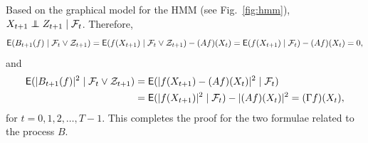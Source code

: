 \documentclass[twoside,11pt]{article}
\def\Fig#1{Fig.~\ref{#1}}
\def\clZ{{\cal Z}}
\def\E{{\sf E}}
\def\Fig#1{Fig.~\ref{#1}}
\def\clZ{{\cal Z}}
\def\E{{\sf E}}
\def\clZ{{\cal Z}}
\def\clF{{\cal F}}
\def\clZ{{\cal Z}}
\def\E{{\sf E}}
\begin{document}
Based on the graphical model for the HMM (see \Fig{fig:hmm}), $X_{t+1} \perp\!\!\!\!\perp Z_{t+1} \mid \clF_t$.
Therefore,
\begin{equation*}
\E (B_{t+1}(f) \mid \clF_{t}
\vee \clZ_{t+1})  = \E (f(X_{t+1}) \mid \clF_{t}
\vee \clZ_{t+1}) - (Af)(X_t) = \E (f(X_{t+1}) \mid \clF_{t}) - (Af)(X_t) = 0,
\end{equation*}
and
\begin{align*}
\E(|B_{t+1}(f)|^2 \mid \clF_{t}
  \vee \clZ_{t+1}) & = \E(|f(X_{t+1}) - (Af)(X_t)|^2 \mid \clF_{t}) \\&= \E(|f(X_{t+1}) |^2 \mid \clF_{t})  - |(Af)(X_t)|^2  =
(\Gamma f)(X_t),
\end{align*}
for $t=0,1,2,\hdots, T-1$.  This completes the proof for the two formulae related to
the process $B$.  
\end{document}
